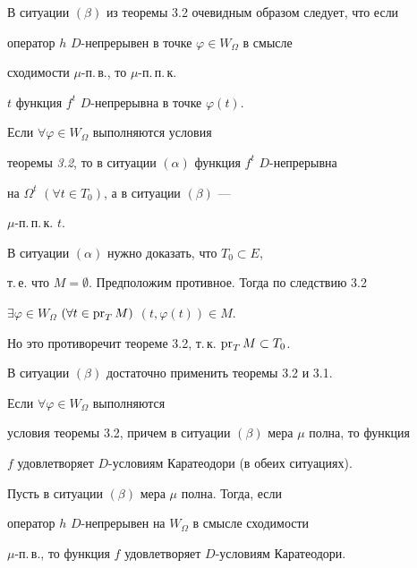 В ситуации $(\beta)$ из теоремы 3.2 очевидным образом следует, что если


оператор $h$ \; $D$-непрерывен в точке $\varphi\in W_\Omega$ в смысле


сходимости $\mu$-п.\,в., то $\mu$-п.\,п.\,к.


$t$ функция $f^t$ \; $D$-непрерывна в точке $\varphi(t)$.





\begin{thms} Если $\forall\varphi\in W_\Omega$ выполняются условия


теоремы {\em 3.2}, то в ситуации $(\alpha)$ функция $f^t$ \; $D$-непрерывна


на $\Omega^t$ \; $(\forall t\in T_0)$, а в ситуации $(\beta)$ ---


$\mu$-п.\,п.\,к. $t$.


\end{thms}





\begin{pf} В ситуации $(\alpha)$ нужно доказать, что $T_0\subset E$,


т.\,е. что $M=\emptyset$. Предположим противное. Тогда по следствию 3.2


$\exists\varphi\in W_\Omega$ $(\forall t\in\operatorname{pr}_T M)$ $(t,\varphi(t))\in M$.


Но это противоречит теореме 3.2, т.\,к. $\operatorname{pr}_T M\subset T_0$.


В ситуации $(\beta)$ достаточно применить теоремы 3.2 и 3.1.


\end{pf}





\begin{cors} Если $\forall\varphi\in W_\Omega$ выполняются


условия теоремы 3.2, причем в ситуации $(\beta)$ мера $\mu$ полна, то функция


$f$ удовлетворяет $D$-условиям Каратеодори (в обеих ситуациях).


\end{cors}





\begin{cors} Пусть в ситуации $(\beta)$ мера $\mu$ полна. Тогда, если


оператор $h$ \; $D$-непрерывен на $W_\Omega$ в смысле сходимости


$\mu$-п.\,в., то функция $f$ удовлетворяет $D$-условиям Каратеодори.


\end{cors}





